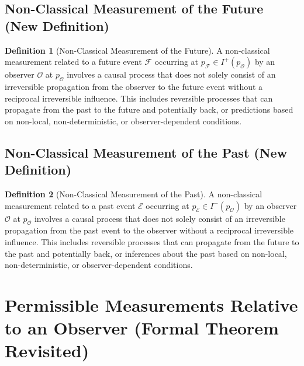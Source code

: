 \documentclass{article}
\theoremstyle{definition}
\newtheorem{definition}{Definition}[section]
\begin{document}
	\subsection{Non-Classical Measurement of the Future (New Definition)}
	
	\begin{definition}[Non-Classical Measurement of the Future]
		A non-classical measurement related to a future event $\mathcal{F}$ occurring at $p_{\mathcal{F}} \in I^+(p_{\mathcal{O}})$ by an observer $\mathcal{O}$ at $p_{\mathcal{O}}$ involves a causal process that does not solely consist of an irreversible propagation from the observer to the future event without a reciprocal irreversible influence. This includes reversible processes that can propagate from the past to the future and potentially back, or predictions based on non-local, non-deterministic, or observer-dependent conditions.
	\end{definition}
	
	\subsection{Non-Classical Measurement of the Past (New Definition)}
	
	\begin{definition}[Non-Classical Measurement of the Past]
		A non-classical measurement related to a past event $\mathcal{E}$ occurring at $p_{\mathcal{E}} \in I^-(p_{\mathcal{O}})$ by an observer $\mathcal{O}$ at $p_{\mathcal{O}}$ involves a causal process that does not solely consist of an irreversible propagation from the past event to the observer without a reciprocal irreversible influence. This includes reversible processes that can propagate from the future to the past and potentially back, or inferences about the past based on non-local, non-deterministic, or observer-dependent conditions.
	\end{definition}
	
	\section{Permissible Measurements Relative to an Observer (Formal Theorem Revisited)}
	
\end{document}
